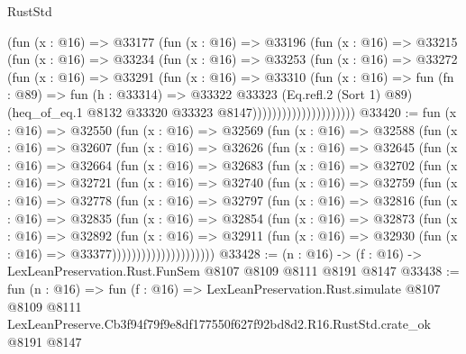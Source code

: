 \begin{lexlean}{RustStd}
\begin{coremodule}
                          (fun (x : @16) =>
                          @33177
                            (fun (x : @16) =>
                            @33196
                              (fun (x : @16) =>
                              @33215
                                (fun (x : @16) =>
                                @33234
                                  (fun (x : @16) =>
                                  @33253
                                    (fun (x : @16) =>
                                    @33272
                                      (fun (x : @16) =>
                                      @33291
                                        (fun (x : @16) =>
                                        @33310
                                          (fun (x : @16) =>
                                          fun (fn : @89) =>
                                          fun (h : @33314) =>
                                          @33322
                                            @33323
                                            (Eq.refl.{2} (Sort 1) @89)
                                            (heq_of_eq.{1}
                                              @8132
                                              @33320
                                              @33323
                                              @8147)))))))))))))))))))))
@33420 := fun (x : @16) =>
  @32550
    (fun (x : @16) =>
    @32569
      (fun (x : @16) =>
      @32588
        (fun (x : @16) =>
        @32607
          (fun (x : @16) =>
          @32626
            (fun (x : @16) =>
            @32645
              (fun (x : @16) =>
              @32664
                (fun (x : @16) =>
                @32683
                  (fun (x : @16) =>
                  @32702
                    (fun (x : @16) =>
                    @32721
                      (fun (x : @16) =>
                      @32740
                        (fun (x : @16) =>
                        @32759
                          (fun (x : @16) =>
                          @32778
                            (fun (x : @16) =>
                            @32797
                              (fun (x : @16) =>
                              @32816
                                (fun (x : @16) =>
                                @32835
                                  (fun (x : @16) =>
                                  @32854
                                    (fun (x : @16) =>
                                    @32873
                                      (fun (x : @16) =>
                                      @32892
                                        (fun (x : @16) =>
                                        @32911
                                          (fun (x : @16) =>
                                          @32930 (fun (x : @16) => @33377)))))))))))))))))))))
@33428 := (n : @16) -> (f : @16) -> LexLeanPreservation.Rust.FunSem @8107 @8109 @8111 @8191 @8147
@33438 := fun (n : @16) =>
  fun (f : @16) =>
  LexLeanPreservation.Rust.simulate
    @8107
    @8109
    @8111
    LexLeanPreserve.Cb3f94f79f9e8df177550f627f92bd8d2.R16.RustStd.crate_ok
    @8191
    @8147
\end{coremodule}
\end{lexlean}
